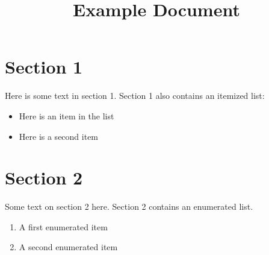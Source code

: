 \documentclass[10pt]{article}  %
\begin{document}

\title{Example Document}       %
\maketitle                     %
\section{Section 1}            %
Here is some text in section 1.  Section 1 also contains an itemized list:
  \begin{itemize}              %
\item Here is an item in the list
\item Here is a second item
\end{itemize}                %

\section{Section 2}            %
Some text on section 2 here.  Section 2 contains an enumerated list.
\begin{enumerate}            %
\item A first enumerated item
\item A second enumerated item
\end{enumerate}              %
\end{document}
